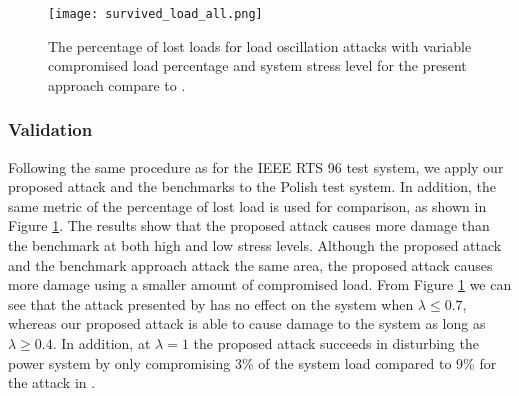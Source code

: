 \documentclass[journal]{IEEEtran}
\begin{document}



\begin{figure}[t]
\texttt{[image: survived\_load\_all.png]}
\caption{The percentage of lost loads for load oscillation attacks with variable compromised load percentage and system stress level for the present approach compare to \cite{carter, Anu}. }
\label{fig: comp_all2}
\end{figure} 

\subsubsection{Validation} Following the same procedure as for the IEEE RTS 96 test system, we apply our proposed attack and the benchmarks to the Polish test system. In addition, the same metric of the percentage of lost load is used for comparison, as shown in Figure \ref{fig: comp_all2}. %
The results show %
that the proposed attack causes more damage than the benchmark at both high and low stress levels. Although the proposed attack and the benchmark \cite{carter} approach attack the same area, the proposed attack causes more damage using a smaller amount of compromised load. From Figure \ref{fig: comp_all2} we can see that the attack presented by \cite{carter} has no effect on the system when $\lambda\leq 0.7$, whereas our proposed attack is able to cause damage to the system as long as $\lambda\geq 0.4$. In addition, at $\lambda = 1$ the proposed attack succeeds in disturbing the power system by only compromising 3\% of the system load compared to 9\% for the attack in \cite{carter}. 
\end{document}
